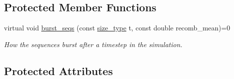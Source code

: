 \subsection*{Protected Member Functions}
\begin{DoxyCompactItemize}
\item 
virtual void \mbox{\hyperlink{classrcombinator_1_1Evolution_ad4af177c458f2d6add719e64c534761a}{burst\+\_\+seqs}} (const \mbox{\hyperlink{constants_8h_abcd18a5521fc90ff6e7b00e4fee98397}{size\+\_\+type}} t, const double recomb\+\_\+mean)=0
\begin{DoxyCompactList}\small\item\em How the sequences burst after a timestep in the simulation. \end{DoxyCompactList}\end{DoxyCompactItemize}
\subsection*{Protected Attributes}
